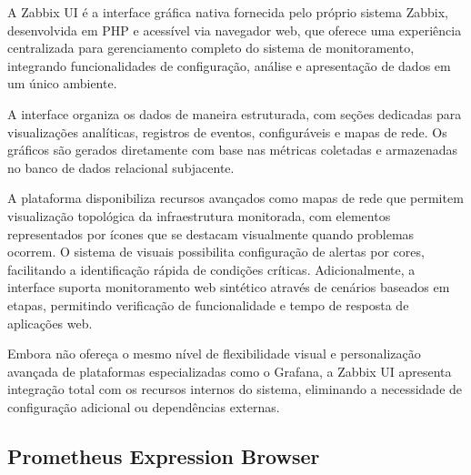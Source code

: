 {\color{red}

A Zabbix UI \citep{zabbix2025} é a interface gráfica nativa fornecida pelo próprio sistema Zabbix, desenvolvida em PHP e acessível via navegador web, que oferece uma experiência centralizada para gerenciamento completo do sistema de monitoramento, integrando funcionalidades de configuração, análise e apresentação de dados em um único ambiente.

A interface organiza os dados de maneira estruturada, com seções dedicadas para visualizações analíticas, registros de eventos,  configuráveis e mapas de rede. Os gráficos são gerados diretamente com base nas métricas coletadas e armazenadas no banco de dados relacional subjacente.

A plataforma disponibiliza recursos avançados como mapas de rede que permitem visualização topológica da infraestrutura monitorada, com elementos representados por ícones que se destacam visualmente quando problemas ocorrem. O sistema de  visuais possibilita configuração de alertas por cores, facilitando a identificação rápida de condições críticas. Adicionalmente, a interface suporta monitoramento web sintético através de cenários baseados em etapas, permitindo verificação de funcionalidade e tempo de resposta de aplicações web.

Embora não ofereça o mesmo nível de flexibilidade visual e personalização avançada de plataformas especializadas como o Grafana, a Zabbix UI apresenta integração total com os recursos internos do sistema, eliminando a necessidade de configuração adicional ou dependências externas.
}

\subsection{Prometheus Expression Browser}
\label{subsection:PrometheusExpressionBrowser}

